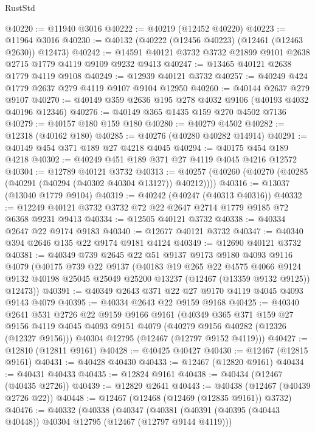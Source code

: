 \begin{lexlean}{RustStd}
\begin{coremodule}
@40220 := @11940 @3016
@40222 := @40219 (@12452 @40220)
@40223 := @11964 @3016
@40230 := @40132 (@40222 (@12456 @40223) (@12461 (@12463 @2630)) @12473)
@40242 := @14591 @40121 @3732 @3732 @21899 @9101 @2638 @2715 @1779 @4119 @9109 @9232 @9413
@40247 := @13465 @40121 @2638 @1779 @4119 @9108
@40249 := @12939 @40121 @3732
@40257 := @40249 @424 @1779 @2637 @279 @4119 @9107 @9104 @12950
@40260 := @40144 @2637 @279 @9107
@40270 := @40149 @359 @2636 @195 @278 @4032 @9106 (@40193 @4032 @40196 @12346)
@40276 := @40149 @365 @1435 @159 @270 @4502 @7136
@40279 := @40157 @180 @159 @180
@40280 := @40279 @4502
@40282 := @12318 (@40162 @180)
@40285 := @40276 (@40280 @40282 @14914)
@40291 := @40149 @454 @371 @189 @27 @4218 @4045
@40294 := @40175 @454 @189 @4218
@40302 := @40249 @451 @189 @371 @27 @4119 @4045 @4216 @12572
@40304 := @12789 @40121 @3732
@40313 := @40257 (@40260 (@40270 (@40285 (@40291 (@40294 (@40302 @40304 @13127)) @40212))))
@40316 := @13037 (@13040 @1779 @9104)
@40319 := @40242 (@40247 (@40313 @40316))
@40332 := @12249 @40121 @3732 @3732 @72 @22 @2647 @2714 @1779 @9185 @72 @6368 @9231 @9413
@40334 := @12505 @40121 @3732
@40338 := @40334 @2647 @22 @9174 @9183
@40340 := @12677 @40121 @3732
@40347 := @40340 @394 @2646 @135 @22 @9174 @9181 @4124
@40349 := @12690 @40121 @3732
@40381 := @40349
    @739
    @2645
    @22
    @51
    @9137
    @9173
    @9180
    @4093
    @9116
    @4079
    (@40175
      @739
      @22
      @9137
      (@40183
        @19
        @265
        @22
        @4575
        @4066
        @9124
        @9132
        @40198
        @25045
        @25049
        @25200
        @13237
        (@12467 (@13359 @9132 @9125))
        @12473))
@40391 := @40349 @2643 @371 @22 @27 @9170 @4119 @4045 @4093 @9143 @4079
@40395 := @40334 @2643 @22 @9159 @9168
@40425 := @40340
    @2641
    @531
    @2726
    @22
    @9159
    @9166
    @9161
    (@40349
      @365
      @371
      @159
      @27
      @9156
      @4119
      @4045
      @4093
      @9151
      @4079
      (@40279 @9156 @40282 (@12326 (@12327 @9156)))
      @40304
      @12795
      (@12467 (@12797 @9152 @4119)))
@40427 := @12810 (@12811 @9161)
@40428 := @40425 @40427
@40430 := @12467 (@12815 @9161)
@40431 := @40428 @40430
@40433 := @12467 (@12820 @9161)
@40434 := @40431 @40433
@40435 := @12824 @9161
@40438 := @40434 (@12467 (@40435 @2726))
@40439 := @12829 @2641
@40443 := @40438 (@12467 (@40439 @2726 @22))
@40448 := @12467 (@12468 (@12469 (@12835 @9161)) @3732)
@40476 := @40332
    (@40338
      (@40347
        (@40381
          (@40391 (@40395 (@40443 @40448)) @40304 @12795 (@12467 (@12797 @9144 @4119)))

\end{coremodule}
\end{lexlean}
